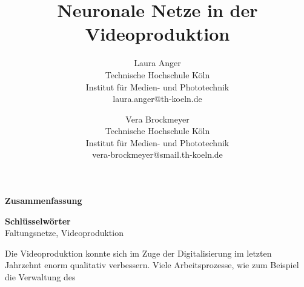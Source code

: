 \documentclass[times, 12pt,twocolumn]{article}
\begin{document}
\title{Neuronale Netze in der Videoproduktion}

\author{Laura Anger\\
Technische Hochschule K\"oln \\ Institut f\"ur Medien- und Phototechnik \\  laura.anger@th-koeln.de \\
\and
Vera Brockmeyer\\
Technische Hochschule K\"oln \\ Institut f\"ur Medien- und Phototechnik \\ vera-brockmeyer@smail.th-koeln.de \\
}

\maketitle
\thispagestyle{empty}

\large{\textbf{Zusammenfassung}}\\ \normalsize
{} 

\large{\textbf{Schl\"usselw\"orter}}\\ \normalsize
 Faltungsnetze, Videoproduktion


 \label{sec:Einleitung}
Die Videoproduktion konnte sich im Zuge der Digitalisierung im letzten Jahrzehnt enorm qualitativ verbessern. Viele Arbeitsprozesse, wie zum Beispiel die Verwaltung des 
 \label{sec:Grundlagen}
 \label{sec:Videoproduktion}
 \label{sec:Faltungsnetze}

 \label{sec:Konzeption}
 \label{sec:SOTAVorverarbeitung}

 \label{sec:Produktion}
 \label{sec:SOTAProduktion}

 \label{sec:Postroduktion}
 \label{sec:SOTAPostproduktion}

 \label{Zusammenfassung}





 

\end{document}
